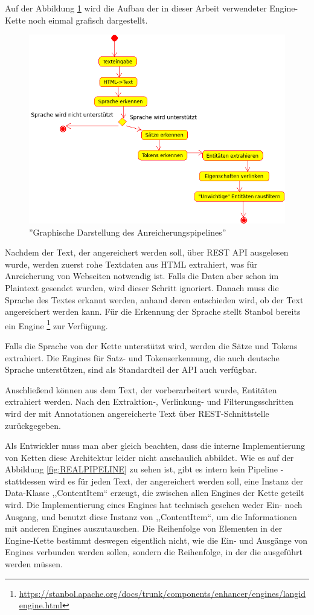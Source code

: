 Auf der Abbildung \ref{fig:ENGINEPIPELINE} wird die Aufbau der in dieser Arbeit verwendeter Engine-Kette noch einmal grafisch dargestellt.
\begin{figure}[ht]
\centering
\includegraphics[width=\textwidth]{Bilder/enchancer.png}
\caption{''Graphische Darstellung des Anreicherungspipelines''}
\label{fig:ENGINEPIPELINE}
\end{figure}
Nachdem der Text, der angereichert werden soll, über REST API ausgelesen wurde, werden zuerst rohe Textdaten aus HTML extrahiert, was für Anreicherung von Webseiten notwendig ist. Falls die Daten aber schon im Plaintext gesendet wurden, wird dieser Schritt ignoriert. Danach muss die Sprache des Textes erkannt werden, anhand deren entschieden wird, ob der Text angereichert werden kann. Für die Erkennung der Sprache stellt Stanbol bereits ein Engine \footnote{\url{https://stanbol.apache.org/docs/trunk/components/enhancer/engines/langidengine.html}} zur Verfügung.

Falls die Sprache von der Kette unterstützt wird, werden die Sätze und Tokens extrahiert. Die Engines für Satz- und Tokenserkennung, die auch deutsche Sprache unterstützen, sind als Standardteil der API auch verfügbar.

Anschließend können aus dem Text, der vorberarbeitert wurde, Entitäten extrahiert werden. Nach den Extraktion-, Verlinkung- und Filterungsschritten wird der mit Annotationen angereicherte Text über REST-Schnittstelle zurückgegeben.

Als Entwickler muss man aber gleich beachten, dass die interne Implementierung von Ketten diese Architektur leider nicht anschaulich abbildet. Wie es auf der Abbildung \ref{fig:REALPIPELINE} zu sehen ist, gibt es intern kein Pipeline - stattdessen wird es für jeden Text, der angereichert werden soll, eine Instanz der Data-Klasse ,,ContentItem`` erzeugt, die zwischen allen Engines der Kette geteilt wird. Die Implementierung eines Engines hat technisch gesehen weder Ein- noch Ausgang, und benutzt diese Instanz von ,,ContentItem``, um die Informationen mit anderen Engines auszutauschen. Die Reihenfolge von Elementen in der Engine-Kette bestimmt deswegen eigentlich nicht, wie die Ein- und Ausgänge von Engines verbunden werden sollen, sondern die Reihenfolge, in der die ausgeführt werden müssen.

